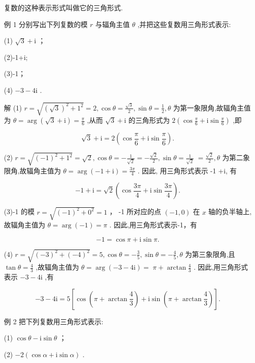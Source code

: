 \documentclass[10pt]{article}
\begin{document}
复数的这种表示形式叫做它的三角形式.

例 1 分别写出下列复数的模 \(r\) 与辐角主值 \(\theta\) ,并把这些复数用三角形式表示:

(1) \(\sqrt{3} + \mathrm{i}\) ；

(2)-1+i;

(3)-1；

(4) \(- 3 - 4\mathrm{i}\) .

解 (1) \(r = \sqrt{{\left( \sqrt{3}\right) }^{2} + {1}^{2}} = 2,\cos \theta  = \frac{\sqrt{3}}{2},\sin \theta  = \frac{1}{2},\theta\) 为第一象限角,故辐角主值为 \(\theta  = \arg \left( {\sqrt{3} + \mathrm{i}}\right)  = \frac{\pi }{6}\) ,从而 \(\sqrt{3} + \mathrm{i}\) 的三角形式为 \(2\left( {\cos \frac{\pi }{6} + \mathrm{i}\sin \frac{\pi }{6}}\right)\) ,即

\[
\sqrt{3} + \mathrm{i} = 2\left( {\cos \frac{\pi }{6} + \mathrm{i}\sin \frac{\pi }{6}}\right) .
\]

(2) \(r = \sqrt{{\left( -1\right) }^{2} + {1}^{2}} = \sqrt{2},\cos \theta  =  - \frac{1}{\sqrt{2}} =  - \frac{\sqrt{2}}{2},\sin \theta  = \frac{1}{\sqrt{2}} \; = \frac{\sqrt{2}}{2},\theta\) 为第二象限角,故辐角主值为 \(\theta  = \arg \left( {-1 + \mathrm{i}}\right)  = \frac{3\pi }{4}\) . 因此, 用三角形式表示 -1 +i, 有

\[
- 1 + \mathrm{i} = \sqrt{2}\left( {\cos \frac{3\pi }{4} + \mathrm{i}\sin \frac{3\pi }{4}}\right) .
\]

(3)-1 的模 \(r = \sqrt{{\left( -1\right) }^{2} + {0}^{2}} = 1\) ， -1 所对应的点 \(\left( {-1,0}\right)\) 在 \(x\) 轴的负半轴上,故辐角主值为 \(\theta  = \arg \left( {-1}\right)  = \pi\) . 因此,用三角形式表示-1，有

\[
- 1 = \cos \pi  + \mathrm{i}\sin \pi .
\]

(4) \(r = \sqrt{{\left( -3\right) }^{2} + {\left( -4\right) }^{2}} = 5,\cos \theta  =  - \frac{3}{5},\sin \theta  =  - \frac{4}{5},\theta\) 为第三象限角,且 \(\tan \theta  = \frac{4}{3}\) ,故辐角主值为 \(\theta  = \arg \left( {-3 - 4\mathrm{i}}\right)  = \; \pi  + \arctan \frac{4}{3}\) . 因此,用三角形式表示 \(- 3 - 4\mathrm{i}\) ,有

\[
- 3 - 4\mathrm{i} = 5\left\lbrack  {\cos \left( {\pi  + \arctan \frac{4}{3}}\right)  + \mathrm{i}\sin \left( {\pi  + \arctan \frac{4}{3}}\right) }\right\rbrack  .
\]

例 2 把下列复数用三角形式表示:

(1) \(\cos \theta  - \mathrm{i}\sin \theta\) ；

(2) \(- 2\left( {\cos \alpha  + \mathrm{i}\sin \alpha }\right)\) .
\end{document}
